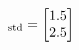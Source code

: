 \documentclass[preview]{standalone}
\begin{document}
\begin{align*}
[\vec x]_{\rm std}=\begin{bmatrix}1.5\\2.5\end{bmatrix}
\end{align*}
\end{document}
